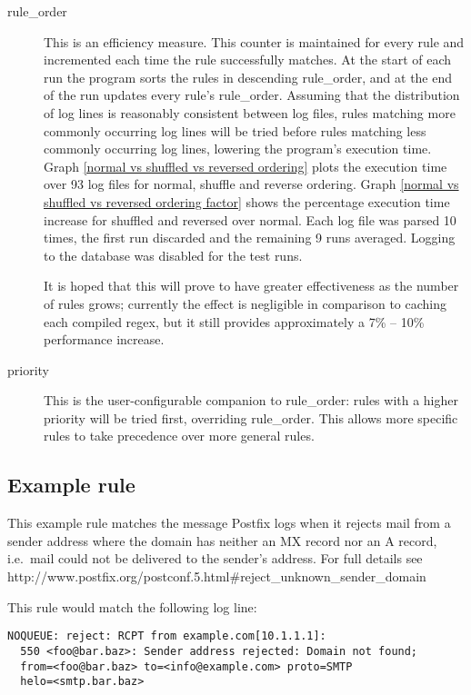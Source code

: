 \documentclass[a4paper,12pt,draft]{article}
\begin{document}
\begin{description}
    \item [rule\_order] This is an efficiency measure.  This counter is
        maintained for every rule and incremented each time the rule
        successfully matches.  At the start of each run the program sorts
        the rules in descending rule\_order, and at the end of the run
        updates every rule's rule\_order.  Assuming that the distribution
        of log lines is reasonably consistent between log files, rules
        matching more commonly occurring log lines will be tried before
        rules matching less commonly occurring log lines, lowering the
        program's execution time.  Graph \ref{normal vs shuffled vs
        reversed ordering} plots the execution time over 93 log files for
        normal, shuffle and reverse ordering.  Graph \ref{normal vs
        shuffled vs reversed ordering factor} shows the percentage
        execution time increase for shuffled and reversed over normal.
        Each log file was parsed 10 times, the first run discarded and the
        remaining 9 runs averaged.  Logging to the database was disabled
        for the test runs.

        It is hoped that this will prove to have greater effectiveness as
        the number of rules grows; currently the effect is negligible
        in comparison to caching each compiled regex, but it still provides
        approximately a 7\% -- 10\% performance increase.

    \item [priority] This is the user-configurable companion to
        rule\_order: rules with a higher priority will be tried first,
        overriding rule\_order.  This allows more specific rules to take
        precedence over more general rules.

\end{description}


\subsection{Example rule}

This example rule matches the message Postfix logs when it rejects mail
from a sender address where the domain has neither an MX record nor an A
record, i.e.\ mail could not be delivered to the sender's address.  For full
details see
http://www.postfix.org/postconf.5.html\#reject\_unknown\_sender\_domain

This rule would match the following log line:

\begin{verbatim}
NOQUEUE: reject: RCPT from example.com[10.1.1.1]: 
  550 <foo@bar.baz>: Sender address rejected: Domain not found;
  from=<foo@bar.baz> to=<info@example.com> proto=SMTP
  helo=<smtp.bar.baz>
\end{verbatim}
\end{document}
